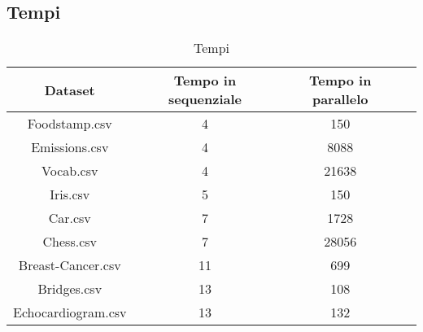 \subsection{Tempi}

\begin{table}[H]
	\centering
	\begin{tabular}{|c|c|c|c|}
		\hline 
		\textbf{Dataset} & \textbf{Tempo in sequenziale} & \textbf{Tempo in parallelo} \\ 
		\hline 
		Foodstamp.csv & 4  & 150  \\ 
		\hline 
		Emissions.csv& 4 & 8088   \\ 
		\hline 
		Vocab.csv& 4 & 21638   \\ 
		\hline 
		Iris.csv& 5 &  150  \\ 
		\hline 
		Car.csv&7  &  1728 \\ 
		\hline 
		Chess.csv&7  &28056   \\ 
		\hline 
		Breast-Cancer.csv& 11 & 699   \\ 
		\hline 
		Bridges.csv& 13 & 108 \\ 
		\hline 
		Echocardiogram.csv& 13 & 132  \\ 
		\hline 
	\end{tabular}
	\caption{Tempi}
	\label{tab:Tempi}
\end{table}

